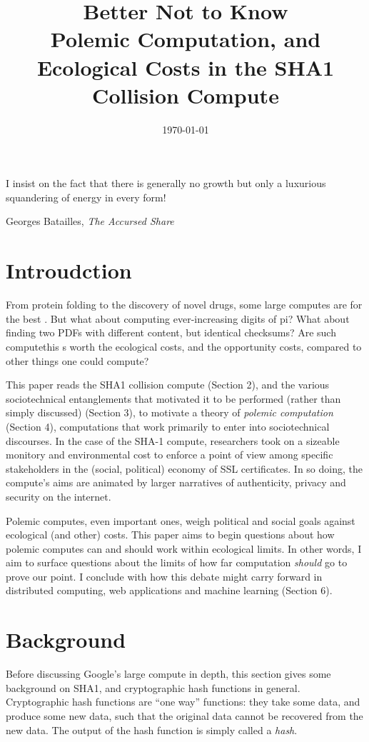 \documentclass[sigconf]{acmart}
\date{\today}
\title{Better Not to Know\\\medskip
\large Polemic Computation, and Ecological Costs in the SHA1 Collision Compute}
\begin{document}
\maketitle

\epigraph{I insist on the fact that there is generally no growth but only a luxurious squandering of energy in every form!}{Georges Batailles, \textit{The Accursed Share}}

\section{Introudction}
\label{sec:orgbf0ed32}

From protein folding to the discovery of novel drugs,
some large computes are for the best
\cite{Anderson2004}.
But what about computing ever-increasing digits of pi?
What about finding two PDFs with different content, but identical checksums?
Are such computethis s worth
the ecological costs, and the opportunity costs, compared to other things one could compute?

This paper reads the SHA1 collision compute (Section 2), and the various sociotechnical entanglements that motivated it to be performed (rather than simply discussed) (Section 3),
to motivate a theory of \emph{polemic computation} (Section 4), 
computations that
work primarily to enter into sociotechnical discourses.
In the case of the SHA-1 compute, researchers took on a sizeable monitory and environmental cost
to enforce a point of view among specific stakeholders in the (social, political) economy of SSL certificates.
In so doing, the compute's aims are animated by
larger narratives of authenticity, privacy and security on the internet.

Polemic computes, even important ones, weigh political and social goals against ecological (and other) costs.
This paper aims to begin questions about how polemic computes can and should work within ecological limits.
In other words, I aim to surface questions about the limits of how far computation \emph{should} go to prove our point.
I conclude with how this debate might carry forward in distributed computing, web applications and machine learning (Section 6).

\section{Background}
\label{sec:orgcfb3be1}


Before discussing Google's large compute in depth,
this section gives some background on SHA1, and cryptographic hash functions in general.
Cryptographic hash functions are ``one way'' functions: 
they take some data, and produce some new data, such that the original data cannot be recovered from the new data. The output of the hash function is simply called a \emph{hash}.
\end{document}
